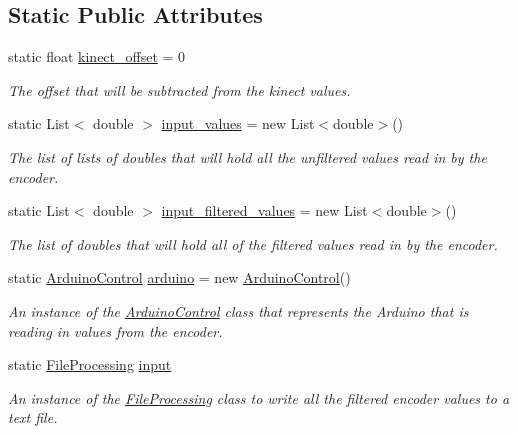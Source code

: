 \subsection*{Static Public Attributes}
\begin{DoxyCompactItemize}
\item 
static float \hyperlink{classkinect_expirement_1_1_encoder_sensor_class_a70bb049741404bcfcce7e78a43739e33}{kinect\+\_\+offset} = 0
\begin{DoxyCompactList}\small\item\em The offset that will be subtracted from the kinect values. \end{DoxyCompactList}\item 
static List$<$ double $>$ \hyperlink{classkinect_expirement_1_1_encoder_sensor_class_ae6c3bb0efe3e841b985741bfa35dc8aa}{input\+\_\+values} = new List$<$double$>$()
\begin{DoxyCompactList}\small\item\em The list of lists of doubles that will hold all the unfiltered values read in by the encoder. \end{DoxyCompactList}\item 
static List$<$ double $>$ \hyperlink{classkinect_expirement_1_1_encoder_sensor_class_a19b9e4e6fe72872dcab2c82a91470c3a}{input\+\_\+filtered\+\_\+values} = new List$<$double$>$()
\begin{DoxyCompactList}\small\item\em The list of doubles that will hold all of the filtered values read in by the encoder. \end{DoxyCompactList}\item 
static \hyperlink{classkinect_expirement_1_1_arduino_control}{Arduino\+Control} \hyperlink{classkinect_expirement_1_1_encoder_sensor_class_a5581b60b2dc6c9311ae5318772aa92f1}{arduino} = new \hyperlink{classkinect_expirement_1_1_arduino_control}{Arduino\+Control}()
\begin{DoxyCompactList}\small\item\em An instance of the {\ttfamily \hyperlink{classkinect_expirement_1_1_arduino_control}{Arduino\+Control}} class that represents the Arduino that is reading in values from the encoder. \end{DoxyCompactList}\item 
static \hyperlink{classkinect_expirement_1_1_file_processing}{File\+Processing} \hyperlink{classkinect_expirement_1_1_encoder_sensor_class_aece38a4f443111c5f0b415463d751fe4}{input}
\begin{DoxyCompactList}\small\item\em An instance of the {\ttfamily \hyperlink{classkinect_expirement_1_1_file_processing}{File\+Processing}} class to write all the filtered encoder values to a text file. \end{DoxyCompactList}\item 

\end{DoxyCompactItemize}
